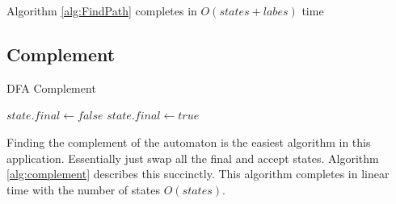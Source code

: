 \documentclass[12pt,journal,compsoc]{IEEEtran}
\theoremstyle{plain}%
\theoremstyle{definition}
\theoremstyle{remark}
\begin{document}
Algorithm \ref{alg:FindPath} completes in $O(states+labes)$ time \cite{clr}


\subsection{Complement}
\begin{algorithm}
    \caption{DFA Complement}
    \label{alg:complement}
\begin{algorithmic}
            \STATE $state.final \gets false$
        \ELSE
            \STATE $state.final \gets true$
        \ENDIF
    \ENDFOR
\end{algorithmic}
\end{algorithm}

Finding the complement of the automaton is the easiest algorithm in this
application. Essentially just swap all the final and accept states. Algorithm
\ref{alg:complement} describes this succinctly. This algorithm completes in
linear time with the number of states $O(states)$.



\end{document}
